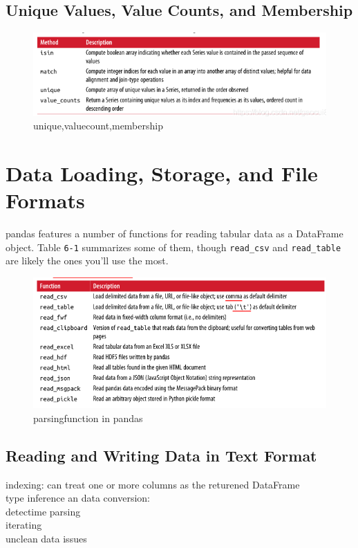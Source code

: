 \documentclass{article}
\begin{document}
\subsection{Unique Values, Value Counts, and Membership}
\begin{figure}[htbp]
	\centering
	\includegraphics[width=\linewidth]{fig/df7}
	\caption{unique,valuecount,membership}
	\label{fig-unique_function}
\end{figure}

\section{Data Loading, Storage, and File Formats}
pandas features a number of functions for reading tabular data as a DataFrame object. Table \verb|6-1| summarizes some of them, though \verb|read_csv| and  \verb|read_table| are likely the ones you’ll use the most.
\begin{figure}[hbpt]
	\centering
	\includegraphics[width=\linewidth]{fig/df8}
	\caption{parsingfunction in pandas}
		\label{fig-csv,table}
\end{figure}
\subsection{Reading and Writing Data in Text Format}
\noindent indexing: can treat one or more columns as the returened DataFrame\\
type inference an data conversion:\\
detectime parsing\\
iterating\\
unclean data issues\\
\end{document}
